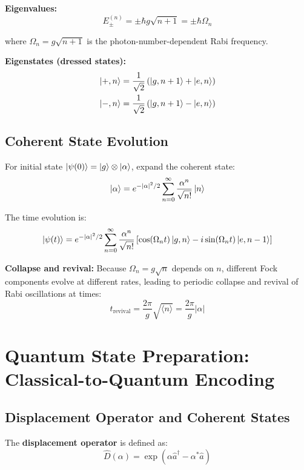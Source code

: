 \documentclass[12pt,a4paper]{article}
\begin{document}
\textbf{Eigenvalues:}
\begin{equation}
E_{\pm}^{(n)} = \pm \hbar g\sqrt{n+1} = \pm \hbar\Omega_n
\end{equation}

where $\Omega_n = g\sqrt{n+1}$ is the photon-number-dependent Rabi frequency.

\textbf{Eigenstates (dressed states):}
\begin{align}
\ket{+, n} &= \frac{1}{\sqrt{2}}\left(\ket{g, n+1} + \ket{e, n}\right)\\
\ket{-, n} &= \frac{1}{\sqrt{2}}\left(\ket{g, n+1} - \ket{e, n}\right)
\end{align}

\subsection{Coherent State Evolution}

For initial state $\ket{\psi(0)} = \ket{g} \otimes \ket{\alpha}$, expand the coherent state:
\begin{equation}
\ket{\alpha} = e^{-|\alpha|^2/2} \sum_{n=0}^{\infty} \frac{\alpha^n}{\sqrt{n!}} \ket{n}
\end{equation}

The time evolution is:
\begin{equation}
\ket{\psi(t)} = e^{-|\alpha|^2/2} \sum_{n=0}^{\infty} \frac{\alpha^n}{\sqrt{n!}} \left[\cos(\Omega_n t)\ket{g,n} - i\sin(\Omega_n t)\ket{e,n-1}\right]
\end{equation}

\textbf{Collapse and revival:} Because $\Omega_n = g\sqrt{n}$ depends on $n$, different Fock components evolve at different rates, leading to periodic collapse and revival of Rabi oscillations at times:
\begin{equation}
t_{\text{revival}} = \frac{2\pi}{g} \sqrt{\langle n \rangle} = \frac{2\pi}{g}|\alpha|
\end{equation}

\section{Quantum State Preparation: Classical-to-Quantum Encoding}

\subsection{Displacement Operator and Coherent States}

The \textbf{displacement operator} is defined as:
\begin{equation}
\hat{D}(\alpha) = \exp(\alpha \hat{a}^\dagger - \alpha^* \hat{a}) \label{eq:displacement_op}
\end{equation}
\end{document}
